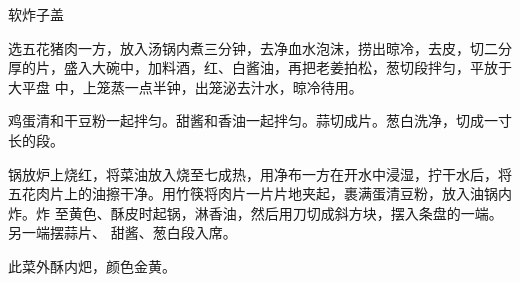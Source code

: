 \begin{recipe}{软炸子盖}

\ingredients


\preparation

\step 选五花猪肉一方，放入汤锅内煮三分钟，去净血水泡沫，捞出晾冷，去皮，切二分
厚的片，盛入大碗中，加料酒，红、白酱油，再把老姜拍松，葱切段拌匀，平放于大平盘
中，上笼蒸一点半钟，出笼泌去汁水，晾冷待用。

\step 鸡蛋清和干豆粉一起拌匀。甜酱和香油一起拌匀。蒜切成片。葱白洗净，切成一寸
长的段。

\step 锅放炉上烧红，将菜油放入烧至七成热，用净布一方在开水中浸湿，拧干水后，将
五花肉片上的油擦干净。用竹筷将肉片一片片地夹起，裹满蛋清豆粉，放入油锅内炸。炸
至黄色、酥皮时起锅，淋香油，然后用刀切成斜方块，摆入条盘的一端。另一端摆蒜片、
甜酱、葱白段入席。

\features

此菜外酥内𤆵，颜色金黄。

\end{recipe}

